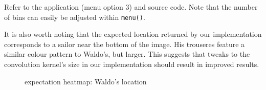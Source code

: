 \documentclass[abstract=true]{scrartcl}
\begin{document}
        Refer to the application (menu option 3) and source code. Note that the
        number of bins can easily be adjusted within \texttt{menu()}.

        It is also worth noting that the expected location returned by our
        implementation corresponds to a sailor near the bottom of the image. His
        trouseres feature a similar colour pattern to Waldo's, but larger. This
        suggests that tweaks to the convolution kernel's size in our
        implementation should result in improved results. 

\begin{figure}
  \centering
  \caption{expectation heatmap: Waldo's location}
\end{figure}
\end{document}
